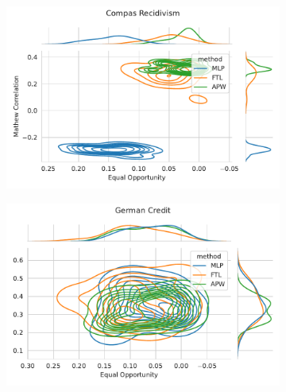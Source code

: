 \begin{figure}
\begin{subfigure}{.45\linewidth}
    \includegraphics[width=1\linewidth]{images/pareto_mcc_opportunity_compas.pdf}
\end{subfigure}
\begin{subfigure}{.45\linewidth}
    \includegraphics[width=1\linewidth]{images/pareto_mcc_opportunity_german.pdf}
\end{subfigure}
\end{figure}

